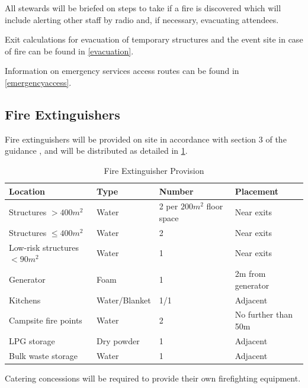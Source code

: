 All stewards will be briefed on steps to take if a fire is discovered which
will include alerting other staff by radio and, if necessary, evacuating
attendees.

Exit calculations for evacuation of temporary structures and the event site in case of
fire can be found in \cref{evacuation}.

Information on emergency services access routes can be found in \cref{emergencyaccess}.

\subsection{Fire Extinguishers}
\label{fire-extinguishers}

Fire extinguishers will be provided on site in accordance with section 3 of the
guidance \cite{firesafety}, and will be distributed as detailed in \cref{table:fireex}.

\begin{table}[h!]
\caption{Fire Extinguisher Provision}
\label{table:fireex}
\centering
\begin{tabular}{| l | l | l | l |}
\hline
    \textbf{Location}            & \textbf{Type} & \textbf{Number} & \textbf{Placement} \\
    \hline
    Structures $>400m^2$         & Water         & 2 per $200m^2$ floor space & Near exits \\
    Structures $\leq400m^2$      & Water         & 2                          & Near exits \\
    Low-risk structures $<90m^2$ & Water         & 1                          & Near exits \\
    Generator                    & Foam          & 1                          & 2m from generator \\
    Kitchens                     & Water/Blanket & 1/1                        & Adjacent \\
    Campsite fire points         & Water         & 2                          & No further than 50m \\
    LPG storage                  & Dry powder    & 1                          & Adjacent \\
    Bulk waste storage           & Water         & 1                          & Adjacent \\
\hline
\end{tabular}
\end{table}

Catering concessions will be required to provide their own firefighting equipment.

